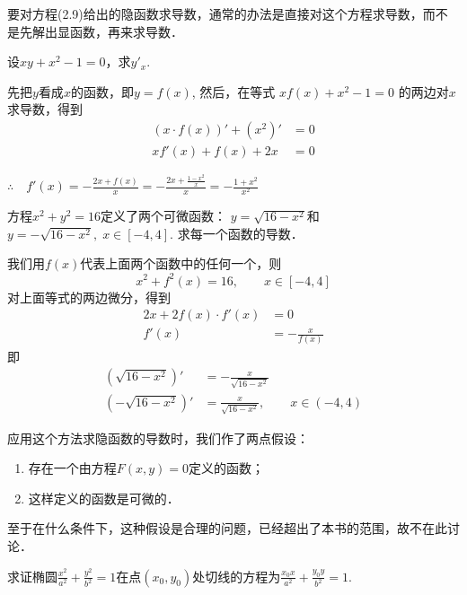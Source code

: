 要对方程(2.9)给出的隐函数求导数，通常的办法是直接对这个方程求导数，而不是先解出显函数，再来求导数．


\begin{example}
设$xy+x^2-1=0$，求$y'_x$.
\end{example}

\begin{solution}
先把$y$看成$x$的函数，即$y=f(x)$, 然后，在等式
$xf (x) +x^2-1=0$
的两边对$x$求导数，得到
\begin{align*}
    (x\cdot f(x))'+(x^2)'&=0\\
xf'(x)+f(x)+2x&=0
\end{align*}

$\therefore\quad f' (x) =-\frac{2x+f (x)}{x}=-\frac{2x+\frac{1-x^2}{x}}{x}=-\frac{1+x^2}{x^2}$    
\end{solution}

\begin{example}
    方程$x^2+y^2=16$定义了两个可微函数：
$y=\sqrt{16-x^2}$和$y=-\sqrt{16-x^2},\; x\in [-4, 4]$. 求每一个函数的导数．
\end{example}


\begin{solution}
    我们用$f(x)$代表上面两个函数中的任何一个，则
\[x^2+f^2 (x) =16,\qquad  x\in  [-4, 4] \]
对上面等式的两边微分，得到
\begin{align*}
    2x+2f (x) \cdot f' (x) &=0\\
    f'(x)&=-\frac{x}{f(x)}
\end{align*}
即
\begin{align*}
    \left(\sqrt{16-x^2}\right)'&=-\frac{x}{\sqrt{16-x^2}}\\
    \left(-\sqrt{16-x^2}\right)'&=\frac{x}{\sqrt{16-x^2}},\qquad x\in(-4,4)
\end{align*}
\end{solution}

\begin{rmk}
应用这个方法求隐函数的导数时，我们作了两点假设：
\begin{enumerate}
    \item 存在一个由方程$F(x,y)=0$定义的函数；
    \item 这样定义的函数是可微的．
\end{enumerate} 
至于在什么条件下，这种假设是合理的问题，已经超出了本书的范围，故不在此讨论．
\end{rmk}

\begin{example}
求证椭圆$\frac{x^2}{a^2}+\frac{y^2}{b^2}=1$在点$(x_0,y_0)$处切线的方程为$\frac{x_0x}{a^2}+\frac{y_0y}{b^2}=1$.
\end{example}

